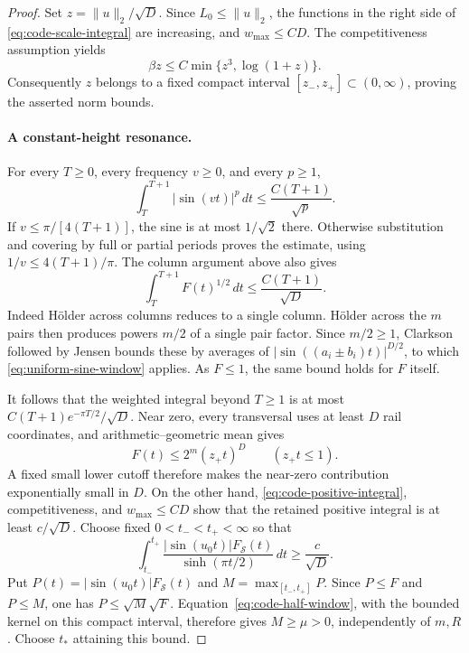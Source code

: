 \begin{proof}
Set $z=\|u\|_2/\sqrt D$. Since $L_0\le\|u\|_2$, the functions in
the right side of \eqref{eq:code-scale-integral} are increasing, and
$w_{\max}\le CD$. The competitiveness assumption yields
\[
 \beta z\le C\min\{z^3,\log(1+z)\}.
\]
Consequently $z$ belongs to a fixed compact interval
$[z_-,z_+]\subset(0,\infty)$, proving the asserted norm bounds.

\paragraph{A constant-height resonance.}
For every $T\ge0$, every frequency $v\ge0$, and every $p\ge1$,
\begin{equation}\label{eq:uniform-sine-window}
 \int_T^{T+1}|\sin(vt)|^p\,dt\le\frac{C(T+1)}{\sqrt p}.
\end{equation}
If $v\le\pi/[4(T+1)]$, the sine is at most $1/\sqrt2$ there.
Otherwise substitution and covering by full or partial periods proves
the estimate, using $1/v\le4(T+1)/\pi$.
The column argument above also gives
\begin{equation}\label{eq:code-half-window}
 \int_T^{T+1}F(t)^{1/2}\,dt\le\frac{C(T+1)}{\sqrt D}.
\end{equation}
Indeed H\"older across columns reduces to a single column. H\"older
across the $m$ pairs then produces powers $m/2$ of a single pair factor.
Since $m/2\ge1$, Clarkson followed by Jensen bounds these by averages
of $|\sin((a_i\pm b_i)t)|^{D/2}$, to which
\eqref{eq:uniform-sine-window} applies. As $F\le1$, the same bound
holds for $F$ itself.

It follows that the weighted integral beyond $T\ge1$ is at most
$C(T+1)e^{-\pi T/2}/\sqrt D$. Near zero, every transversal uses at
least $D$ rail coordinates, and arithmetic--geometric mean gives
\[
 F(t)\le2^m(z_+t)^D\qquad(z_+t\le1).
\]
A fixed small lower cutoff therefore makes the near-zero contribution
exponentially small in $D$. On the other hand,
\eqref{eq:code-positive-integral}, competitiveness, and $w_{\max}\le CD$
show that the retained positive integral is at least $c/\sqrt D$.
Choose fixed $0<t_-<t_+<\infty$ so that
\[
 \int_{t_-}^{t_+}
 \frac{|\sin(u_0t)|F_{\mathcal S}(t)}{\sinh(\pi t/2)}\,dt
 \ge\frac c{\sqrt D}.
\]
Put $P(t)=|\sin(u_0t)|F_{\mathcal S}(t)$ and
$M=\max_{[t_-,t_+]}P$. Since $P\le F$ and $P\le M$, one has
$P\le\sqrt M\sqrt F$. Equation~\eqref{eq:code-half-window}, with
the bounded kernel on this compact interval, therefore gives
$M\ge\mu>0$, independently of $m,R$. Choose $t_*$ attaining this bound.


\end{proof}
